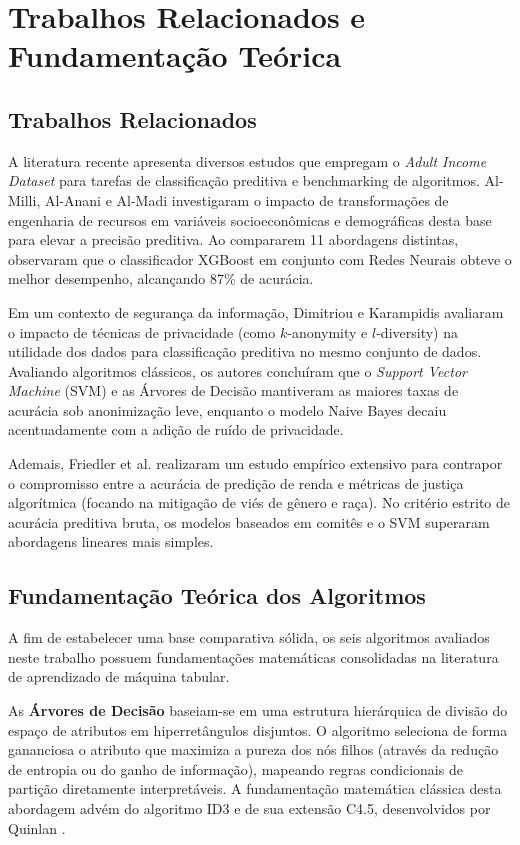\section{Trabalhos Relacionados e Fundamentação Teórica}

\subsection{Trabalhos Relacionados}
A literatura recente apresenta diversos estudos que empregam o \textit{Adult Income Dataset} para tarefas de classificação preditiva e benchmarking de algoritmos. Al-Milli, Al-Anani e Al-Madi \cite{almilli2024investigation} investigaram o impacto de transformações de engenharia de recursos em variáveis socioeconômicas e demográficas desta base para elevar a precisão preditiva. Ao compararem 11 abordagens distintas, observaram que o classificador XGBoost em conjunto com Redes Neurais obteve o melhor desempenho, alcançando 87\% de acurácia.

Em um contexto de segurança da informação, Dimitriou e Karampidis \cite{dimitriou2023comparison} avaliaram o impacto de técnicas de privacidade (como $k$-anonymity e $l$-diversity) na utilidade dos dados para classificação preditiva no mesmo conjunto de dados. Avaliando algoritmos clássicos, os autores concluíram que o \textit{Support Vector Machine} (SVM) e as Árvores de Decisão mantiveram as maiores taxas de acurácia sob anonimização leve, enquanto o modelo Naive Bayes decaiu acentuadamente com a adição de ruído de privacidade.

Ademais, Friedler et al. \cite{friedler2019comparative} realizaram um estudo empírico extensivo para contrapor o compromisso entre a acurácia de predição de renda e métricas de justiça algorítmica (focando na mitigação de viés de gênero e raça). No critério estrito de acurácia preditiva bruta, os modelos baseados em comitês e o SVM superaram abordagens lineares mais simples.

\subsection{Fundamentação Teórica dos Algoritmos}
A fim de estabelecer uma base comparativa sólida, os seis algoritmos avaliados neste trabalho possuem fundamentações matemáticas consolidadas na literatura de aprendizado de máquina tabular.

As \textbf{Árvores de Decisão} baseiam-se em uma estrutura hierárquica de divisão do espaço de atributos em hiperretângulos disjuntos. O algoritmo seleciona de forma gananciosa o atributo que maximiza a pureza dos nós filhos (através da redução de entropia ou do ganho de informação), mapeando regras condicionais de partição diretamente interpretáveis. A fundamentação matemática clássica desta abordagem advém do algoritmo ID3 e de sua extensão C4.5, desenvolvidos por Quinlan \cite{quinlan1986induction}.

